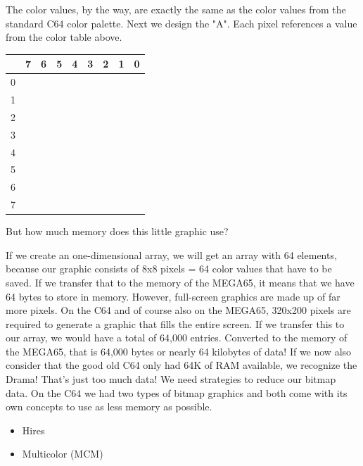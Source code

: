 The color values, by the way, are exactly the same as the color values from the standard C64 color palette. Next we design the "A". Each pixel references a value from the color table above.


\begin{center}
\begin{tabular}{|m{6pt}|m{6pt}m{6pt}m{6pt}m{6pt}m{6pt}m{5pt}m{6pt}m{6pt}|}
\hline
	& 7 & 6 & 5 & 4 & 3 & 2 & 1 & 0 \\
\hline
	0 & \blkb & \blkb & \blkb & \blkb & \blkb & \blkb & \blkb & \blkb \\
	1 & \red & \lgr & \yel & \lgr & \red & \ora & \blkb & \blkb \\
	2 & \lgr & \lgr & \blkb & \blkb & \ora & \red & \blkb & \blkb \\
	3 & \yel & \yel & \blkb & \blkb & \ora & \red & \blkb & \blkb \\
	4 & \yel & \lgr & \lgr & \red & \red & \red & \blkb & \blkb \\
	5 & \lgr & \red & \blkb & \blkb & \ora & \red & \blkb & \blkb \\
	6 & \red & \red & \blkb & \blkb & \red & \red & \blkb & \blkb \\
	7 & \ora & \bwn & \blkb & \blkb & \ora & \red & \blkb & \blkb \\
\hline
\end{tabular}
\end{center}

But how much memory does this little graphic use?

If we create an one-dimensional array, we will get an array with 64 elements, because our graphic consists of 8x8 pixels = 64 color values that have to be saved. If we transfer that to the memory of the MEGA65, it means that we have 64 bytes to store in memory. However, full-screen graphics are made up of far more pixels. On the C64 and of course also on the MEGA65, 320x200 pixels are required to generate a graphic that fills the entire screen. If we transfer this to our array, we would have a total of 64,000 entries. Converted to the memory of the MEGA65, that is 64,000 bytes or nearly 64 kilobytes of data! If we now also consider that the good old C64 only had 64K of RAM available, we recognize the Drama! That's just too much data! We need strategies to reduce our bitmap data. On the C64 we had two types of bitmap graphics and both come with its own concepts to use as less memory as possible.

\begin{itemize}
	\item Hires
	\item Multicolor (MCM)
\end{itemize}


